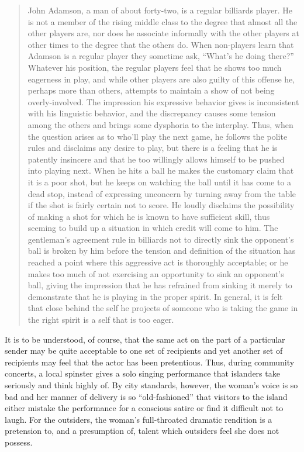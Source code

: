 \documentclass[twoside,symmetric,nobib,justified]{tufte-book}
\begin{document}
\begin{quote}
John Adamson, a man of about forty-two, is a regular billiards player.
He is not a member of the rising middle class to the degree that almost
all the other players are, nor does he associate informally with the
other players at other times to the degree that the others do. When
non-players learn that Adamson is a regular player they sometime ask,
``What's he doing there?'' Whatever his position, the regular players
feel that he shows too much eagerness in play, and while other players
are also guilty of this offense he, perhaps more than others, attempts
to maintain a show of not being overly-involved. The impression his
expressive behavior gives is inconsistent with his linguistic behavior,
and the discrepancy causes some tension among the others and brings some
dysphoria to the interplay. Thus, when the question arises as to who'll
play the next game, he follows the polite rules and disclaims any desire
to play, but there is a feeling that he is patently insincere and that
he too willingly allows himself to be pushed into playing next. When he
hits a ball he makes the customary claim that it is a poor shot, but he
keeps on watching the ball until it has come to a dead stop, instead of
expressing unconcern by turning away from the table if the shot is
fairly certain not to score. He loudly disclaims the possibility of
making a shot for which he is known to have sufficient skill, thus
seeming to build up a situation in which credit will come to him. The
gentleman's agreement rule in billiards not to directly sink the
opponent's ball is broken by him before the tension and definition of
the situation has reached a point where this aggressive act is
thoroughly acceptable; or he makes too much of not exercising an
opportunity to sink an opponent's ball, giving the impression that he
has refrained from sinking it merely to demonstrate that he is playing
in the proper spirit. In general, it is felt that close behind the self
he projects of someone who is taking the game in the right spirit is a
self that is too eager.
\end{quote}

\noindent It is to be understood, of course, that the same act on the part of a
particular sender may be quite acceptable to one set of recipients and
yet another set of recipients may feel that the actor has been
pretentious. Thus, during community concerts, a local spinster gives a
solo singing performance that islanders take seriously and think highly
of. By city standards, however, the woman's voice is so bad and her
manner of delivery is so ``old-fashioned'' that visitors to the island
either mistake the performance for a conscious satire or find it
difficult not to laugh. For the outsiders, the woman's full-throated
dramatic rendition is a pretension to, and a presumption of, talent
which outsiders feel she does not possess.
\end{document}
